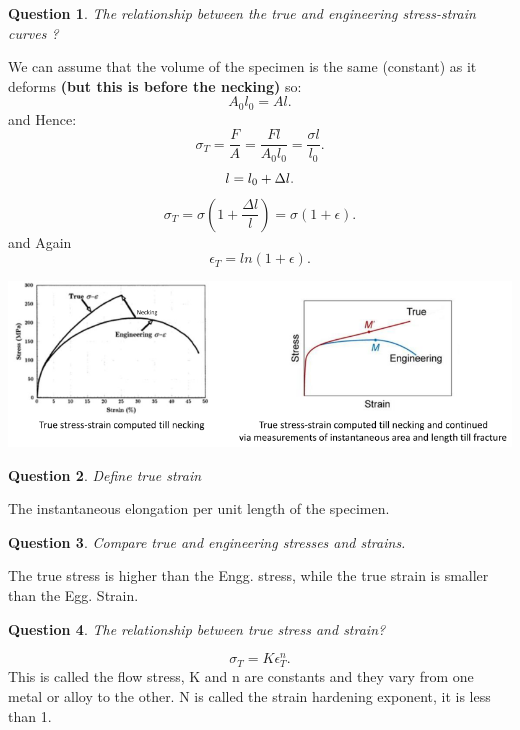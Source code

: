 \documentclass[13]{article}
\newtheorem{exer}{Question}
\begin{document}
\begin{exer}
The relationship between the true and engineering stress-strain curves ?
\end{exer}
We can assume that the volume of the specimen is the same (constant) as it deforms \textbf{(but this is before the necking)}  so:
\[
A_0l_0 = Al
.\] 
and Hence:
\[
\sigma_T = \frac{F}{A} = \frac{Fl}{A_0l_0} = \frac{\sigma l}{l_0}
.\] 
\[
l = l_0+\Delta l \\ 
.\] 
\[
\sigma_T = \sigma (1+\frac{\Delta l}{l}) = \sigma (1+ \epsilon)
.\]
and Again
\[
	\epsilon_T = ln(1+ \epsilon)
.\] 
\begin{center}
\includegraphics[scale=0.5]{figures/8.png}
\end{center}
\begin{exer}
Define true strain
\end{exer}
The instantaneous elongation per unit length of the specimen.
\begin{exer}
Compare true and engineering stresses and strains.
\end{exer}
The true stress is higher than the Engg. stress, while the true strain is smaller than the Egg. Strain.
\begin{exer}
The relationship between true stress and strain?
\end{exer}
\[
\sigma_T = K \epsilon_T^n
.\] 
This is called the flow stress, K and n are constants and they vary from one metal or alloy to the other. N is called the strain hardening exponent, it is less than 1. 
\end{document}
